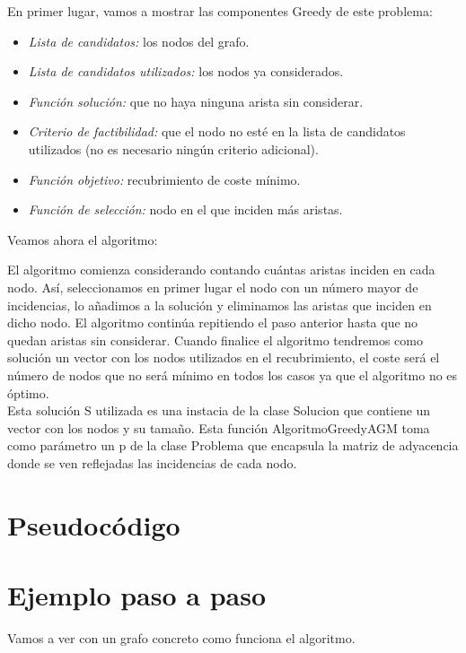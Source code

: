 \documentclass[11pt]{article}
\begin{document}
En primer lugar, vamos a mostrar las componentes Greedy de este problema:

\begin{itemize}
	\item \textit{Lista de candidatos:} los nodos del grafo.
	\item \textit{Lista de candidatos utilizados:} los nodos ya considerados.
	\item \textit{Función solución:} que no haya ninguna arista sin considerar.
	\item \textit{Criterio de factibilidad:} que el nodo no esté en la lista de candidatos utilizados (no es necesario ningún criterio adicional).
	\item \textit{Función objetivo:} recubrimiento de coste mínimo.
	\item \textit{Función de selección:} nodo en el que inciden más aristas.
\end{itemize}

Veamos ahora el algoritmo:

	
\vspace{1em}

El algoritmo comienza considerando contando cuántas aristas inciden en cada nodo. Así, seleccionamos en primer lugar el nodo con un número mayor de incidencias, lo añadimos a la solución y eliminamos las aristas que inciden en dicho nodo. El algoritmo continúa repitiendo el paso anterior hasta que no quedan aristas sin considerar. Cuando finalice el algoritmo tendremos como solución un vector con los nodos utilizados en el recubrimiento, el coste será el número de nodos que no será mínimo en todos los casos ya que el algoritmo no es óptimo.\\



Esta solución S utilizada es una instacia de la clase Solucion que contiene un vector con los nodos y su tamaño.
Esta función AlgoritmoGreedyAGM toma como parámetro un p de la clase Problema que encapsula la matriz de adyacencia donde se ven reflejadas las incidencias de cada nodo.

\section*{Pseudocódigo}

\section*{Ejemplo paso a paso}
Vamos a ver con un grafo concreto como funciona el algoritmo.
\end{document}
